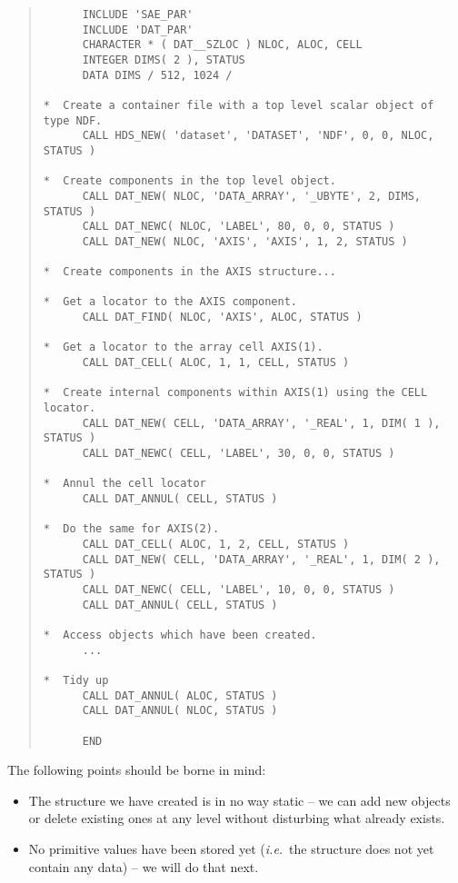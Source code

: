 \documentclass[11pt]{article}
\newcommand{\st}[1]{{\em{#1}}}
\begin{document}
\small
\begin{quote}
\begin{verbatim}
      INCLUDE 'SAE_PAR'
      INCLUDE 'DAT_PAR'
      CHARACTER * ( DAT__SZLOC ) NLOC, ALOC, CELL
      INTEGER DIMS( 2 ), STATUS
      DATA DIMS / 512, 1024 /

*  Create a container file with a top level scalar object of type NDF.
      CALL HDS_NEW( 'dataset', 'DATASET', 'NDF', 0, 0, NLOC, STATUS )

*  Create components in the top level object.
      CALL DAT_NEW( NLOC, 'DATA_ARRAY', '_UBYTE', 2, DIMS, STATUS )
      CALL DAT_NEWC( NLOC, 'LABEL', 80, 0, 0, STATUS )
      CALL DAT_NEW( NLOC, 'AXIS', 'AXIS', 1, 2, STATUS )

*  Create components in the AXIS structure...

*  Get a locator to the AXIS component.
      CALL DAT_FIND( NLOC, 'AXIS', ALOC, STATUS )

*  Get a locator to the array cell AXIS(1).
      CALL DAT_CELL( ALOC, 1, 1, CELL, STATUS )

*  Create internal components within AXIS(1) using the CELL locator.
      CALL DAT_NEW( CELL, 'DATA_ARRAY', '_REAL', 1, DIM( 1 ), STATUS )
      CALL DAT_NEWC( CELL, 'LABEL', 30, 0, 0, STATUS )

*  Annul the cell locator
      CALL DAT_ANNUL( CELL, STATUS )

*  Do the same for AXIS(2).
      CALL DAT_CELL( ALOC, 1, 2, CELL, STATUS )
      CALL DAT_NEW( CELL, 'DATA_ARRAY', '_REAL', 1, DIM( 2 ), STATUS )
      CALL DAT_NEWC( CELL, 'LABEL', 10, 0, 0, STATUS )
      CALL DAT_ANNUL( CELL, STATUS )

*  Access objects which have been created.
      ...

*  Tidy up
      CALL DAT_ANNUL( ALOC, STATUS )
      CALL DAT_ANNUL( NLOC, STATUS )

      END
\end{verbatim}
\end{quote}
\normalsize

The following points should be borne in mind:

\begin{itemize}

\item The structure we have created is in no way static -- we can add
new objects or delete existing ones at any level without disturbing
what already exists.

\item No primitive values have been stored yet (\st{i.e.}\ the
structure does not yet contain any data) -- we will do that next.

\end{itemize}
\end{document}
